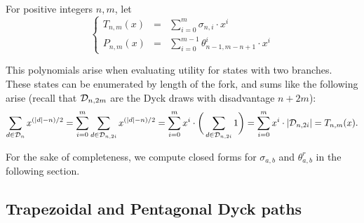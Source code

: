 \begin{mydef}
For positive integers $n,m$, let
$$
\left\{
\begin{array}{lll}
T_{n,m}(x) &=& \displaystyle \sum_{i = 0}^{m} \sigma_{n,i}\cdot x^i\\
P_{n,m}(x) &=& \displaystyle \sum_{i = 0}^{m-1} \theta_{n-1,m-n+1}^i\cdot x^i
\end{array}
\right.
$$
\end{mydef}

This polynomials arise when evaluating utility for states with two branches. These states can be enumerated by length of the fork, and sums like the following arise (recall that $\mathcal{D}_{n,2m}$ are the Dyck draws with disadvantage $n+2m$):
$$
\sum_{d\in \mathcal{D}_{n}} x^{(|d|-n)/2} = \sum_{i=0}^m \sum_{d\in \mathcal{D}_{n,2i}} x^{(|d|-n)/2} = \sum_{i=0}^m x^i\cdot  \bigg(\sum_{d\in\mathcal{D}_{n,2i}} 1\bigg) = \sum_{i=0}^m x^i\cdot |\mathcal{D}_{n,2i}| = T_{n,m}(x).
$$

For the sake of completeness, we compute closed forms for $\sigma_{a,b}$ and $\theta_{a,b}^r$ in the following section.



 \subsection{Trapezoidal and Pentagonal Dyck paths}
 \label{appendix-trapezoid}
 
